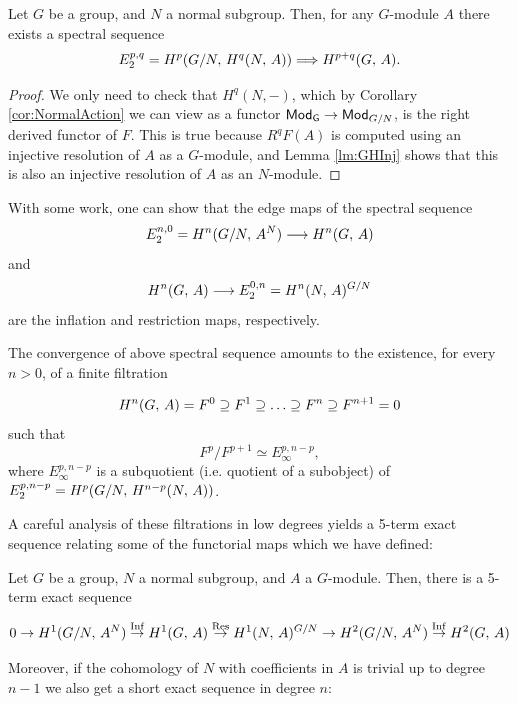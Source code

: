 \documentclass[a4paper, oneside]{memoir}
\begin{document}
\begin{theorem}\label{thm:HS}
	Let $G$ be a group, and $N$ a normal subgroup. Then, for any $G$-module $A$ there exists a spectral sequence
	\[
		E_2^{p,q} = H^{p}( G/N, \, H^{q}( N, \, A ) ) \Longrightarrow H^{p+q}( G, \, A )
		.\]
\end{theorem}

\begin{proof}
	We only need to check that $H^q(N,-)$, which by Corollary \ref{cor:NormalAction} we can view as a functor $\mathsf{Mod}_\mathsf{G} \to \mathsf{Mod}_{G/N}$, is the right derived functor of $F$. This is true because $R^qF(A)$ is computed using an injective resolution of $A$ as a $G$-module, and Lemma \ref{lm:GHInj} shows that this is also an injective resolution of $A$ as an $N$-module.
\end{proof}

\begin{remark}
	With some work, one can show that the edge maps of the spectral sequence
	\[
		E_2^{n,0}=H^{n}( G /N, \, A^N ) \longrightarrow H^{n}( G, \, A )
	\]
	and
	\[
		H^{n}( G, \, A ) \longrightarrow E_2^{0,n} = H^{n}( N, \, A )^{G/N}
	\]
	are the inflation and restriction maps, respectively.
\end{remark}

The convergence of above spectral sequence amounts to the existence, for every $n>0$, of a finite filtration

\[
	H^{n}( G, \, A )=F^0\supseteq F^1\supseteq\ldots\supseteq F^n\supseteq F^{n+1}=0
\]
such that
\begin{equation}\label{eq:Convergence}
	F^p/F^{p+1} \simeq E_\infty^{p,n-p},
\end{equation}
where $E_\infty^{p,n-p}$ is a subquotient (i.e. quotient of a subobject) of $E_2^{p,n-p}= H^{p}( G/N, \, H^{n-p}( N, \, A ) )$.

A careful analysis of these filtrations in low degrees yields a 5-term exact sequence relating some of the functorial maps which we have defined:

\begin{corollary}\label{cor:LowDegree}
	Let $G$ be a group, $N$ a normal subgroup, and $A$ a $G$-module. Then, there is a 5-term exact sequence

	\[
		0\to H^{1}( G / N, \, A^N )\overset{\operatorname{Inf}}{\to} H^{1}( G, \, A )\overset{\operatorname{Res}}{\to} H^{1}( N, \, A )^{G /N} \to H^{2}( G /N, \, A^N )\overset{\operatorname{Inf}}{\to} H^{2}( G, \, A )
	\]

\end{corollary}

Moreover, if the cohomology of $N$ with coefficients in $A$ is trivial up to degree $n-1$ we also get a short exact sequence in degree $n$:
\end{document}
